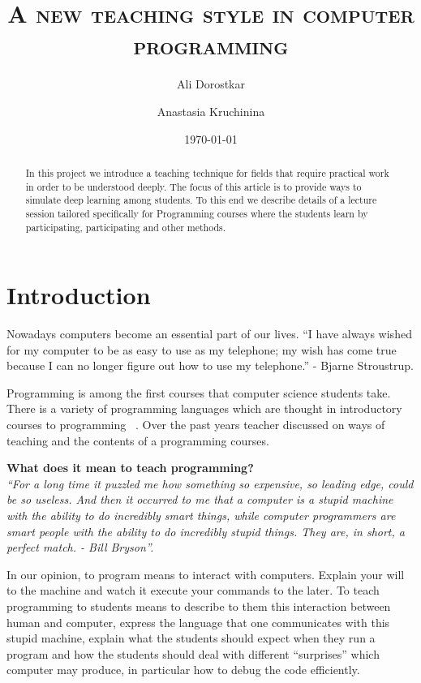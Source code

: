 \documentclass{article}
\author{Ali Dorostkar \and Anastasia Kruchinina}
\title{\textsc{A new teaching style in computer programming}}
\date{\today}
\begin{document}
\maketitle \begin{abstract}
In this project we introduce a teaching technique for fields that require
practical work in order to be understood deeply. The focus of this article is 
to provide ways to simulate deep learning among students. To this end we describe 
details of a lecture session tailored specifically for Programming courses
where the students learn by participating, participating and other methods.
\end{abstract}

\section{Introduction} %
\label{sec:introduction}

Nowadays computers become an essential part of our lives.  ``I have always wished
for my computer to be as easy to use as my telephone; my wish has come true
because I can no longer figure out how to use my telephone.'' - Bjarne
Stroustrup.  

Programming is among the first courses that computer science students take.
There is a variety of programming languages which are thought in introductory
courses to programming ~\cite{de2002language}. Over the past years teacher
discussed on ways of teaching and the contents of a programming courses.

\textbf{What does it mean to teach programming?}\\
\emph{``For a long time it puzzled me how something so expensive, so leading edge,
could be so useless. And then it occurred to me that a computer is a stupid
machine with the ability to do incredibly smart things, while computer
programmers are smart people with the ability to do incredibly stupid things.
They are, in short, a perfect match. - Bill Bryson''.}

In our opinion, to program means to interact with computers. Explain your will
to the machine and watch it execute your commands to the later. To teach
programming to students means to describe to them this interaction between human
and computer, express the language that one communicates with this stupid
machine, explain what the students should expect when they run a program and how
the students should deal with different ``surprises'' which computer may
produce, in particular how to debug the code efficiently.
\end{document}
